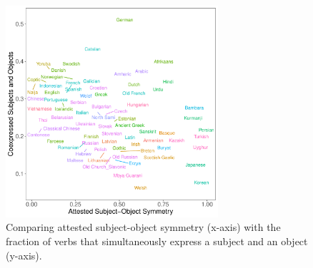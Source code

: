 \documentclass[11pt,a4paper]{article}
\newcommand\comment[1]{{\color{red}#1}}
\newcommand\mhahn[1]{{\color{red}(#1)}}
\begin{document}



\begin{figure}
    \centering
    \includegraphics[width=0.7\textwidth]{../analysis/figures/objects-order-pureud-byVerb_FORMAT.pdf}
    \caption{Comparing attested subject-object symmetry (x-axis) with the fraction of verbs that simultaneously express a subject and an object (y-axis).}
    \label{fig:study2}
\end{figure}
\end{document}
